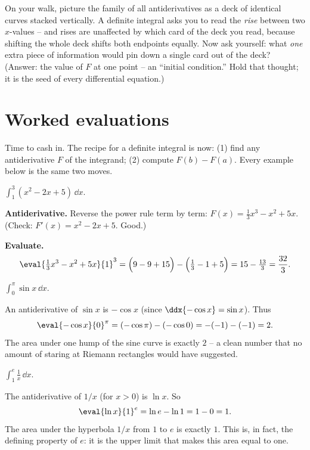 \begin{walkbox}
On your walk, picture the family of all antiderivatives as a deck of identical
curves stacked vertically. A definite integral asks you to read the \emph{rise}
between two $x$-values -- and rises are unaffected by which card of the deck you
read, because shifting the whole deck shifts both endpoints equally. Now ask
yourself: what \emph{one} extra piece of information would pin down a single card
out of the deck? (Answer: the value of $F$ at one point -- an ``initial
condition.'' Hold that thought; it is the seed of every differential equation.)
\end{walkbox}

\section{Worked evaluations}

Time to cash in. The recipe for a definite integral is now: (1) find any
antiderivative $F$ of the integrand; (2) compute $F(b)-F(a)$. Every example below
is the same two moves.

\begin{example}\label{ch21:ex-poly}
$\displaystyle \int_1^3 (x^2 - 2x + 5)\,\dd x.$

\textbf{Antiderivative.} Reverse the power rule term by term:
$F(x)=\tfrac13 x^3 - x^2 + 5x$. (Check: $F'(x)=x^2-2x+5$. Good.)

\textbf{Evaluate.}
\[
  \eval{\tfrac13 x^3 - x^2 + 5x}{1}^{3}
  = \Big(9 - 9 + 15\Big) - \Big(\tfrac13 - 1 + 5\Big)
  = 15 - \tfrac{13}{3} = \frac{32}{3}.
\]
\end{example}

\begin{example}\label{ch21:ex-sin}
$\displaystyle \int_0^{\pi} \sin x\,\dd x.$

An antiderivative of $\sin x$ is $-\cos x$ (since $\ddx{-\cos x}=\sin x$). Thus
\[
  \eval{-\cos x}{0}^{\pi} = (-\cos\pi) - (-\cos 0) = -(-1) - (-1) = 2.
\]
The area under one hump of the sine curve is exactly $2$ -- a clean number that
no amount of staring at Riemann rectangles would have suggested.
\end{example}

\begin{example}\label{ch21:ex-recip}
$\displaystyle \int_1^{e} \frac{1}{x}\,\dd x.$

The antiderivative of $1/x$ (for $x>0$) is $\ln x$. So
\[
  \eval{\ln x}{1}^{e} = \ln e - \ln 1 = 1 - 0 = 1.
\]
The area under the hyperbola $1/x$ from $1$ to $e$ is exactly $1$. This is, in
fact, the defining property of $e$: it is the upper limit that makes this area
equal to one.
\end{example}

